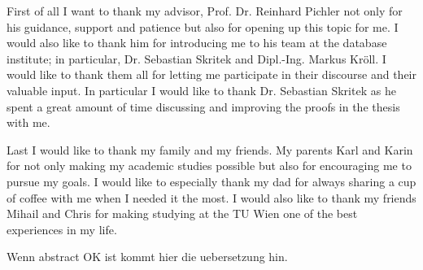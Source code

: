 \documentclass[draft,final]{vutinfth} %
\begin{document}
\frontmatter %

\addstatementpage

\begin{acknowledgements*}
	First of all I want to thank my advisor, Prof. Dr. Reinhard Pichler not only
	for his guidance, support and patience but also for opening up this topic for me.
	I would also like to thank him for introducing me to his team at the
	database institute; in particular,  Dr. Sebastian Skritek and Dipl.-Ing. Markus Kr{\"o}ll. I would like to
	thank them all for letting me participate in their discourse and their
	valuable input. In particular I would like to thank
	Dr. Sebastian Skritek as he spent a great amount of time discussing and
	improving the proofs in the thesis with me. 

	\noindent
	Last I would like to thank my family and my friends. 
	My parents Karl and Karin for not only making my academic studies possible but
	also for encouraging me to pursue my goals. I would like to especially thank my dad 
	for always sharing a cup of coffee with me when I needed it the most. 
	I would also like to thank my friends Mihail and Chris for making studying
	at the TU Wien one of the best experiences in my life. 
\end{acknowledgements*}

\begin{kurzfassung}
	Wenn abstract OK ist kommt hier die uebersetzung hin.
\end{kurzfassung}
\end{document}

